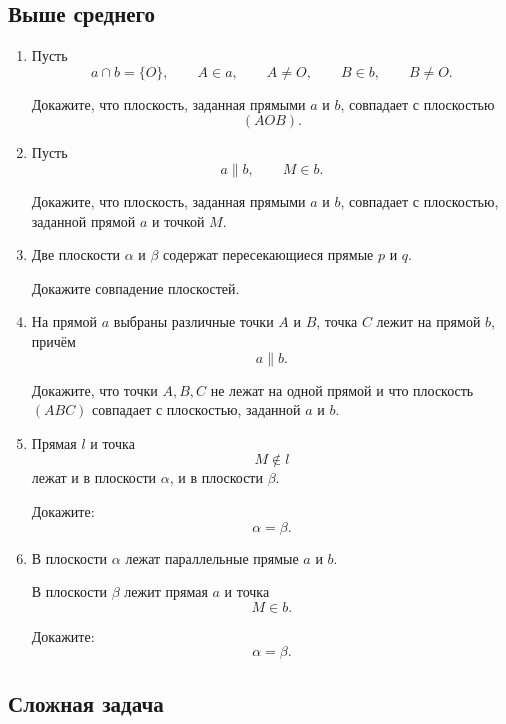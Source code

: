 \documentclass[a4paper,12pt]{article}
\begin{document}
\subsection*{Выше среднего}

\begin{enumerate}[resume]

    \item
    Пусть
    \[
    a\cap b=\{O\},
    \qquad
    A\in a,
    \qquad
    A\ne O,
    \qquad
    B\in b,
    \qquad
    B\ne O.
    \]

    Докажите, что плоскость,
    заданная прямыми $a$ и $b$,
    совпадает с плоскостью
    \[
    (AOB).
    \]

    \item
    Пусть
    \[
    a\parallel b,
    \qquad
    M\in b.
    \]

    Докажите, что плоскость,
    заданная прямыми $a$ и $b$,
    совпадает с плоскостью,
    заданной прямой $a$ и точкой $M$.

    \item
    Две плоскости $\alpha$ и $\beta$
    содержат пересекающиеся прямые $p$ и $q$.

    Докажите совпадение плоскостей.

    \item
    На прямой $a$ выбраны различные точки $A$ и $B$,
    точка $C$ лежит на прямой $b$, причём
    \[
    a\parallel b.
    \]

    Докажите, что точки $A,B,C$
    не лежат на одной прямой
    и что плоскость $(ABC)$ совпадает
    с плоскостью, заданной $a$ и $b$.

    \item
    Прямая $l$ и точка
    \[
    M\notin l
    \]
    лежат и в плоскости $\alpha$,
    и в плоскости $\beta$.

    Докажите:
    \[
    \alpha=\beta.
    \]

    \item
    В плоскости $\alpha$ лежат параллельные
    прямые $a$ и $b$.

    В плоскости $\beta$ лежит прямая $a$
    и точка
    \[
    M\in b.
    \]

    Докажите:
    \[
    \alpha=\beta.
    \]

\end{enumerate}

\subsection*{Сложная задача}
\end{document}
